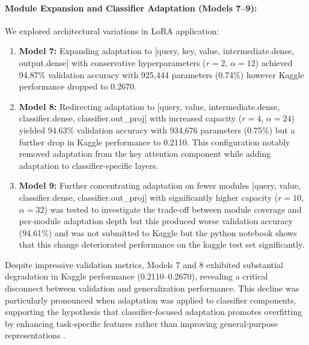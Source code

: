 \documentclass[letterpaper]{article}
\begin{document}
\paragraph{Module Expansion and Classifier Adaptation (Models 7--9):} We explored architectural variations in LoRA application:
\begin{enumerate}
    \item \textbf{Model 7:} Expanding adaptation to [query, key, value, intermediate.dense, output.dense] with conservative hyperparameters ($r=2$, $\alpha=12$) achieved 94.87\% validation accuracy with 925,444 parameters (0.74\%) however Kaggle performance dropped to 0.2670. 
    
    \item \textbf{Model 8:} Redirecting adaptation to [query, value, intermediate.dense, classifier.dense, classifier.out\_proj] with increased capacity ($r=4$, $\alpha=24$) yielded 94.63\% validation accuracy with 934,676 parameters (0.75\%) but a further drop in Kaggle performance to 0.2110. This configuration notably removed adaptation from the key attention component while adding adaptation to classifier-specific layers. 
    
    \item \textbf{Model 9:} Further concentrating adaptation on fewer modules [query, value, classifier.dense, classifier.out\_proj] with significantly higher capacity ($r=10$, $\alpha=32$) was tested to investigate the trade-off between module coverage and per-module adaptation depth but this produced worse validation accuracy (94.61\%) and was not submitted to Kaggle but the python notebook shows that this change deteriorated performance on the kaggle test set significantly.
\end{enumerate}

Despite impressive validation metrics, Models 7 and 8 exhibited substantial degradation in Kaggle performance (0.2110--0.2670), revealing a critical disconnect between validation and generalization performance. This decline was particularly pronounced when adaptation was applied to classifier components, supporting the hypothesis that classifier-focused adaptation promotes overfitting by enhancing task-specific features rather than improving general-purpose representations \citep{hu2022lora}.
\end{document}

